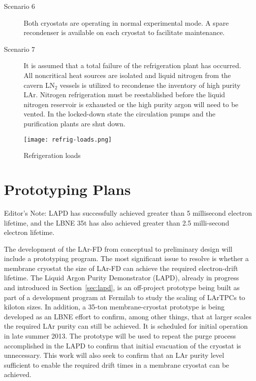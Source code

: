 \begin{description}
\item[Scenario 6]
Both cryostats are operating in normal experimental mode.  A spare recondenser is available on each cryostat to facilitate maintenance.

\item[Scenario 7]
It is assumed that a total failure of the refrigeration plant has occurred. All noncritical heat sources are isolated and liquid nitrogen from the cavern LN$_2$ vessels is utilized to recondense the inventory of high purity LAr. Nitrogen refrigeration must be reestablished before the liquid nitrogen reservoir is exhausted or the high purity argon will need to be vented. In the locked-down state the circulation pumps and the purification plants are shut down.
\end{description}

\begin{figure}[htbp]
\centering
\texttt{[image: refrig-loads.png]}
\caption{Refrigeration loads}
\label{fig:Refrigeration-loads}
\end{figure}

\begin{figure}[htbp]
\centering
\end{figure}


\section{Prototyping Plans}
\label{sec:cryo-cryosys-proto-plans}

\begin{editornote}
  Editor's Note:  LAPD has successfully achieved greater than 5 millisecond electron lifetime, and the LBNE 35t has also achieved greater than 2.5 milli-second electron lifetime. 
\end{editornote}

The development of the LAr-FD from conceptual to preliminary design will include a prototyping program. The most significant issue to resolve is whether a membrane cryostat the size of LAr-FD can achieve the required electron-drift lifetime. The Liquid Argon Purity Demonstrator (LAPD), already in progress and introduced in Section~\ref{sec:lapd}, is an off-project prototype being built as part of a development program at Fermilab to study the scaling of LArTPCs to kiloton sizes. In addition, a 35-ton membrane-cryostat prototype is being developed as an LBNE effort to confirm, among other things, that at larger scales the required LAr purity can still be achieved. It is scheduled for initial operation in late summer 2013. The prototype will be used to repeat the purge process accomplished in the LAPD to confirm that initial evacuation of the cryostat is unnecessary. This work will also seek to confirm that an LAr purity level sufficient to enable the required drift times in a membrane cryostat can be achieved.



